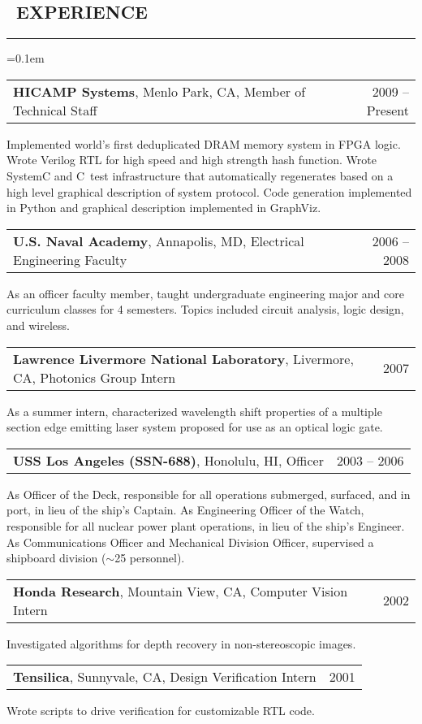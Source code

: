 \documentclass[10pt,letterpaper]{article}
\makeatletter
\newenvironment{changemargin}[2]
{%
    \begin{list}{}{%
        \setlength{\topsep}{0pt}%
        \setlength{\leftmargin}{#1}%
        \setlength{\rightmargin}{#2}%
        \setlength{\listparindent}{\parindent}%
        \setlength{\itemindent}{\parindent}%
        \setlength{\parsep}{\parskip}%
    }%
    \item[]
}%
{%
    \end{list}
}%
\newenvironment{content}
{%
    \begin{changemargin}{0cm}{2.5cm}
    \begin{itemize*}
        \vspace{-0.15em}
}%
{%
    \end{itemize*}
    \end{changemargin}
}%
\newenvironment{resumesection}[1]
{%
    \subsection*{\ #1}
    \vspace{-0.4em}
    \hrule
    \vspace{+0.4em}
    \begin{itemize}
        \parskip=0.1em
}%
{%
    \end{itemize}
}%
\newcommand{\headerrowx}[2]
{\item[] \begin{tabular*}{\linewidth}{l@{\extracolsep{\fill}}r}
	#1 &
	#2 \\
\end{tabular*}}
\newcommand{\CPP}
{C\nolinebreak[4]\hspace{-.05em}\raisebox{.22ex}{\footnotesize\bf +\hspace{-.20em}+}\ }
\makeatother
\begin{document}
\begin{resumesection}{EXPERIENCE}
    \headerrowx{ \textbf{HICAMP Systems}, Menlo Park, CA, Member of Technical Staff} {2009 -- Present}
    \begin{content}
        \item[] Implemented world's first deduplicated DRAM memory system in FPGA logic.
                Wrote Verilog RTL for high speed and high strength hash function.
                Wrote SystemC and \CPP test infrastructure that automatically regenerates based on a high level graphical description of system protocol.
                Code generation implemented in Python and graphical description implemented in GraphViz.
    \end{content}
    \headerrowx{ \textbf{U.S. Naval Academy}, Annapolis, MD, Electrical Engineering Faculty} {2006 -- 2008}
    \begin{content}
        \item[] As an officer faculty member, taught undergraduate engineering major and core curriculum classes for 4 semesters.
                Topics included circuit analysis, logic design, and wireless.
    \end{content}
    \headerrowx{ \textbf{Lawrence Livermore National Laboratory}, Livermore, CA, Photonics Group Intern} {2007}
    \begin{content}
        \item[] As a summer intern, characterized wavelength shift properties of a multiple section edge emitting laser system proposed for use as an optical logic gate.
    \end{content}
    \headerrowx{ \textbf{USS Los Angeles (SSN-688)}, Honolulu, HI, Officer} {2003 -- 2006}
    \begin{content}
        \item[] As Officer of the Deck, responsible for all operations submerged, surfaced, and in port, in lieu of the ship's Captain.
                As Engineering Officer of the Watch, responsible for all nuclear power plant operations, in lieu of the ship's Engineer.
                As Communications Officer and Mechanical Division Officer, supervised a shipboard division ({\footnotesize{$\sim$}}25 personnel).
    \end{content}
    \headerrowx{ \textbf{Honda Research}, Mountain View, CA, Computer Vision Intern} {2002}
    \begin{content}
        \item[] Investigated algorithms for depth recovery in non-stereoscopic images.
    \end{content}
    \headerrowx{ \textbf{Tensilica}, Sunnyvale, CA, Design Verification Intern} {2001}
    \begin{content}
        \item[] Wrote scripts to drive verification for customizable RTL code.
    \end{content}
\end{resumesection}
\end{document}
